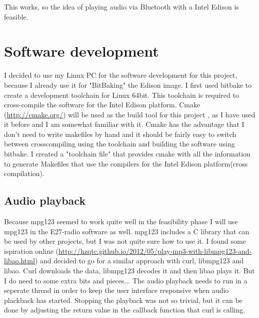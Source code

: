 \documentclass[12pt,a4paper]{scrreprt}
\begin{document}
This works, so the idea of playing audio via Bluetooth with a Intel Edison is feasible.

\section{Software development}
I decided to use my Linux PC for the software development for this project, because I already use it for "BitBaking" the Edison image.
I first used bitbake to create a development toolchain for Linux 64bit. This toolchain is required to cross-compile the software for the Intel Edison platform.
Cmake (\url{http://cmake.org/}) will be used as the build tool for this project , as I have used it before and I am somewhat familiar with it.
Cmake has the advantage that I don't need to write makefiles by hand and it should be fairly easy to switch between crosscompiling using the toolchain and building the software using bitbake.
I created a "toolchain file" that provides cmake with all the information to generate Makefiles that use the compilers for the Intel Edison platform(cross compilation). 

\subsection{Audio playback}
Because mpg123 seemed to work quite well in the feasibility phase I will use mpg123 in the E27-radio software as well. mpg123 includes a C library that can be used by other projects, but I was not quite sure how to use it.
I found some ispiration online (\url{http://hzqtc.github.io/2012/05/play-mp3-with-libmpg123-and-libao.html}) and decided to go for a similar approach with curl, libmpg123 and libao. 
Curl downloads the data, libmpg123 decodes it and then libao plays it.
But I do need to some extra bits and pieces... 
The audio playback needs to run in a seperate thread in order to keep the user interface responsive when audio plackback has started. Stopping the playback was not so trivial, but it can be done by adjusting the return value in the  callback function that curl is calling.  
\end{document}
